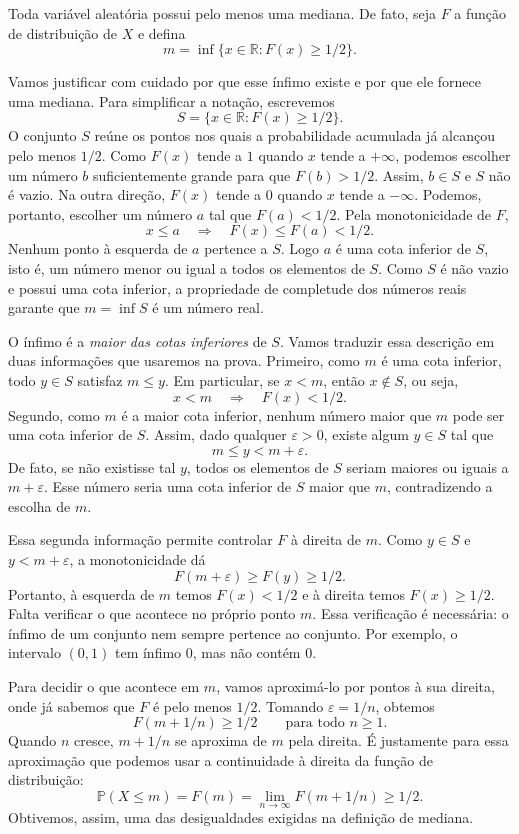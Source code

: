 \documentclass[12pt,portuguese]{article}
\theoremstyle{definition}
\theoremstyle{plainexercise}
\theoremstyle{starredexercise}
\theoremstyle{definition}
\begin{document}
Toda variável aleatória possui pelo menos uma mediana. De fato, seja $F$ a
função de distribuição de $X$ e defina
\[
m=\inf\{x\in\mathbb{R}:F(x)\geqslant1/2\}.
\]

Vamos justificar com cuidado por que esse ínfimo existe e por que ele
fornece uma mediana. Para simplificar a notação, escrevemos
\[
S=\{x\in\mathbb{R}:F(x)\geqslant1/2\}.
\]
O conjunto $S$ reúne os pontos nos quais a probabilidade acumulada já
alcançou pelo menos $1/2$. Como $F(x)$ tende a $1$ quando $x$ tende a
$+\infty$, podemos escolher um número $b$ suficientemente grande para que
$F(b)>1/2$. Assim, $b\in S$ e $S$ não é vazio. Na outra direção,
$F(x)$ tende a $0$ quando $x$ tende a $-\infty$. Podemos, portanto,
escolher um número $a$ tal que $F(a)<1/2$. Pela monotonicidade de $F$,
\[
x\leqslant a\quad\Longrightarrow\quad F(x)\leqslant F(a)<1/2.
\]
Nenhum ponto à esquerda de $a$ pertence a $S$. Logo $a$ é uma cota inferior
de $S$, isto é, um número menor ou igual a todos os elementos de $S$.
Como $S$ é não vazio e possui uma cota inferior, a propriedade de
completude dos números reais garante que $m=\inf S$ é um número real.

O ínfimo é a \emph{maior das cotas inferiores} de $S$. Vamos traduzir essa
descrição em duas informações que usaremos na prova. Primeiro, como $m$ é
uma cota inferior, todo $y\in S$ satisfaz $m\leqslant y$. Em particular,
se $x<m$, então $x\notin S$, ou seja,
\[
x<m\quad\Longrightarrow\quad F(x)<1/2.
\]
Segundo, como $m$ é a maior cota inferior, nenhum número maior que $m$
pode ser uma cota inferior de $S$. Assim, dado qualquer $\varepsilon>0$,
existe algum $y\in S$ tal que
\[
m\leqslant y<m+\varepsilon.
\]
De fato, se não existisse tal $y$, todos os elementos de $S$ seriam maiores
ou iguais a $m+\varepsilon$. Esse número seria uma cota inferior de $S$
maior que $m$, contradizendo a escolha de $m$.

Essa segunda informação permite controlar $F$ à direita de $m$. Como
$y\in S$ e $y<m+\varepsilon$, a monotonicidade dá
\[
F(m+\varepsilon)\geqslant F(y)\geqslant1/2.
\]
Portanto, à esquerda de $m$ temos $F(x)<1/2$ e à direita temos
$F(x)\geqslant1/2$. Falta verificar o que acontece no próprio ponto $m$.
Essa verificação é necessária: o ínfimo de um conjunto nem sempre pertence
ao conjunto. Por exemplo, o intervalo $(0,1)$ tem ínfimo $0$, mas não
contém $0$.



Para decidir o que acontece em $m$, vamos aproximá-lo por pontos à sua
direita, onde já sabemos que $F$ é pelo menos $1/2$. Tomando
$\varepsilon=1/n$, obtemos
\[
F(m+1/n)\geqslant1/2\qquad\text{para todo }n\geqslant1.
\]
Quando $n$ cresce, $m+1/n$ se aproxima de $m$ pela direita. É justamente
para essa aproximação que podemos usar a continuidade à direita da função
de distribuição:
\[
\mathbb{P}(X\leqslant m)=F(m)
=\lim_{n\to\infty}F(m+1/n)\geqslant1/2.
\]
Obtivemos, assim, uma das desigualdades exigidas na definição de mediana.
\end{document}
